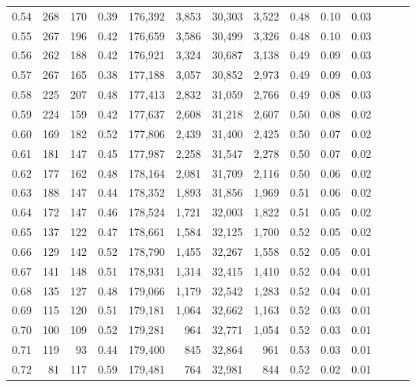 \begin{tabular}{rrrrrrrrrrrrrr}
0.54 &    268 &    170 &  0.39 &  176,392 &    3,853 &  30,303 &   3,522 &  0.48 &  0.10 &      0.03 \\
0.55 &    267 &    196 &  0.42 &  176,659 &    3,586 &  30,499 &   3,326 &  0.48 &  0.10 &      0.03 \\
0.56 &    262 &    188 &  0.42 &  176,921 &    3,324 &  30,687 &   3,138 &  0.49 &  0.09 &      0.03 \\
0.57 &    267 &    165 &  0.38 &  177,188 &    3,057 &  30,852 &   2,973 &  0.49 &  0.09 &      0.03 \\
0.58 &    225 &    207 &  0.48 &  177,413 &    2,832 &  31,059 &   2,766 &  0.49 &  0.08 &      0.03 \\
0.59 &    224 &    159 &  0.42 &  177,637 &    2,608 &  31,218 &   2,607 &  0.50 &  0.08 &      0.02 \\
0.60 &    169 &    182 &  0.52 &  177,806 &    2,439 &  31,400 &   2,425 &  0.50 &  0.07 &      0.02 \\
0.61 &    181 &    147 &  0.45 &  177,987 &    2,258 &  31,547 &   2,278 &  0.50 &  0.07 &      0.02 \\
0.62 &    177 &    162 &  0.48 &  178,164 &    2,081 &  31,709 &   2,116 &  0.50 &  0.06 &      0.02 \\
0.63 &    188 &    147 &  0.44 &  178,352 &    1,893 &  31,856 &   1,969 &  0.51 &  0.06 &      0.02 \\
0.64 &    172 &    147 &  0.46 &  178,524 &    1,721 &  32,003 &   1,822 &  0.51 &  0.05 &      0.02 \\
0.65 &    137 &    122 &  0.47 &  178,661 &    1,584 &  32,125 &   1,700 &  0.52 &  0.05 &      0.02 \\
0.66 &    129 &    142 &  0.52 &  178,790 &    1,455 &  32,267 &   1,558 &  0.52 &  0.05 &      0.01 \\
0.67 &    141 &    148 &  0.51 &  178,931 &    1,314 &  32,415 &   1,410 &  0.52 &  0.04 &      0.01 \\
0.68 &    135 &    127 &  0.48 &  179,066 &    1,179 &  32,542 &   1,283 &  0.52 &  0.04 &      0.01 \\
0.69 &    115 &    120 &  0.51 &  179,181 &    1,064 &  32,662 &   1,163 &  0.52 &  0.03 &      0.01 \\
0.70 &    100 &    109 &  0.52 &  179,281 &      964 &  32,771 &   1,054 &  0.52 &  0.03 &      0.01 \\
0.71 &    119 &     93 &  0.44 &  179,400 &      845 &  32,864 &     961 &  0.53 &  0.03 &      0.01 \\
0.72 &     81 &    117 &  0.59 &  179,481 &      764 &  32,981 &     844 &  0.52 &  0.02 &      0.01 \\

\end{tabular}
